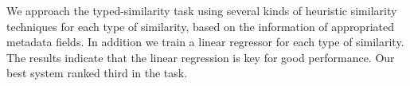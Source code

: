 We approach the typed-similarity task using several kinds of heuristic similarity techniques for each type of similarity, based on the information of
 appropriated metadata fields. In addition we train a linear regressor for each
 type of similarity. The results indicate that the linear regression is key for
 good performance. Our best system ranked third in the task.

